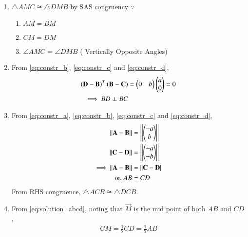 \renewcommand{\theequation}{\theenumi}
\begin{enumerate}[label=\thesection.\arabic*.,ref=\thesection.\theenumi]
	
\item $\triangle AMC \cong \triangle DMB$  by SAS congruency $\because$
\begin{enumerate}
\item $AM = BM$
\item $CM = DM$
\item $\angle AMC$ = $\angle DMB$ ( Vertically Opposite Angles)
\end{enumerate}
%
\item From \eqref{eq:constr_b}, \eqref{eq:constr_c} and \eqref{eq:constr_d},
%
%
\begin{align}
\left(\mathbf{D}-\mathbf{B}\right)^T
\left(\mathbf{B}-\mathbf{C}\right) &= \begin{pmatrix}0 & b\end{pmatrix}\begin{pmatrix}a \\ 0\end{pmatrix} = 0
\\
\implies BD \perp BC
\end{align}
%
\item From \eqref{eq:constr_a}, \eqref{eq:constr_b}, \eqref{eq:constr_c} and \eqref{eq:constr_d},
\begin{align}
\left\lVert\mathbf{A}-\mathbf{B}\right\rVert &= \left\lVert\begin{pmatrix}-a \\ b\end{pmatrix}\right\rVert
\\
\left\lVert\mathbf{C}-\mathbf{D}\right\rVert &= \left\lVert\begin{pmatrix}-a \\ -b\end{pmatrix}\right\rVert
\\
\implies \left\lVert\mathbf{A}-\mathbf{B}\right\rVert &= \left\lVert\mathbf{C}-\mathbf{D}\right\rVert\\
\text{or, } AB &=CD
\label{eq:solution_abcd}
\end{align}
%
From RHS congruence,  $\triangle ACB \cong  \triangle DCB$.
\item From \eqref{eq:solution_abcd}, noting that $\vec{M}$ is the mid point of both $AB$ and $CD$, 
\begin{align}
CM = \frac{1}{2}CD =\frac{1}{2} AB
\end{align}



\end{enumerate}
